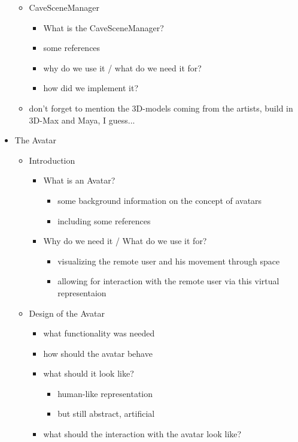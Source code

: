\documentclass[conference]{acmsiggraph}
\begin{document}
\begin{itemize}
{\begin{itemize}
{\begin{itemize}
		\end{itemize}
	}
	\item{CaveSceneManager
		\begin{itemize}
		\item What is the CaveSceneManager?
		\item some references
		\item why do we use it / what do we need it for?
		\item how did we implement it?
		\end{itemize}
	}
	\item don't forget to mention the 3D-models coming from the artists, build in 3D-Max and Maya, I guess...
	\end{itemize}
}
\item{The Avatar
	\begin{itemize}
	\item{Introduction
		\begin{itemize}
		\item{What is an Avatar?
			\begin{itemize}
			\item some background information on the concept of avatars
			\item including some references
			\end{itemize}
		}
		\item{Why do we need it / What do we use it for?
			\begin{itemize}
			\item visualizing the remote user and his movement through space
			\item allowing for interaction with the remote user via this virtual representaion
			\end{itemize}
		}
		\end{itemize}			
	}
	\item{Design of the Avatar
		\begin{itemize}
		\item what functionality was needed
		\item how should the avatar behave
		\item{what should it look like?
			\begin{itemize}
			\item human-like representation
			\item but still abstract, artificial
			\end{itemize}
		}
		\item{what should the interaction with the avatar look like?
			\begin{itemize}

\end{itemize}}
\end{itemize}}
\end{itemize}}
\end{itemize}
\end{document}
